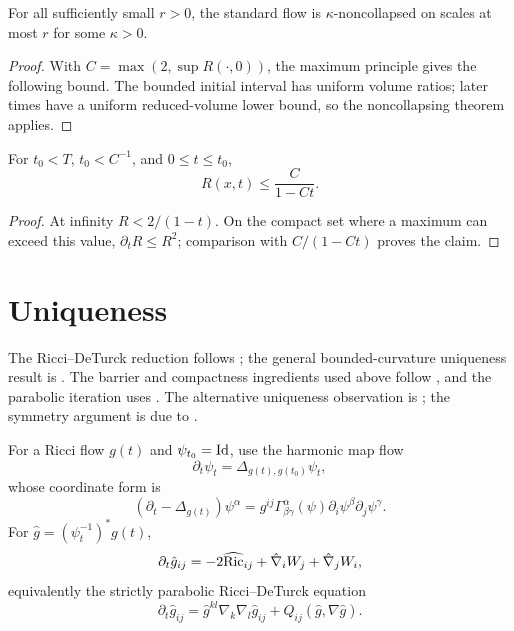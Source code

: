 \begin{proposition}
\label{prop:standard-flow-kappa-noncollapsed}
\label{stdkappa}

For all sufficiently small $r>0$, the standard flow is
$\kappa$-noncollapsed on scales at most $r$ for some $\kappa>0$.
\end{proposition}
\begin{proof}

\sketch With $C=\max(2,\sup R(\cdot,0))$, the maximum principle gives
the following bound. The bounded initial interval has uniform volume ratios;
later times have a uniform reduced-volume lower bound, so the noncollapsing
theorem applies.
\end{proof}
\begin{claim}
\label{claim:standard-flow-curvature-bound}

For $t_0<T$, $t_0<C^{-1}$, and $0\le t\le t_0$,
\[R(x,t)\le\frac C{1-Ct}.\]
\end{claim}
\begin{proof}
\sketch At infinity $R<2/(1-t)$. On the compact set where a maximum can
exceed this value, $\partial_tR\le R^2$; comparison with $C/(1-Ct)$ proves
the claim.
\end{proof}

\section{Uniqueness}\label{12.4}
The Ricci--DeTurck reduction follows \cite{DeTurck}\cite{LuTian}; the general
bounded-curvature uniqueness result is \cite{ChenZhu}. The barrier and
compactness ingredients used above follow \cite{Hamiltonlimits}\cite{Shi1},
and the parabolic iteration uses \cite{LiTam}\cite{LiTam}\cite{LSU}\cite{LSU}.
The alternative uniqueness observation is \cite{ChenZhu}; the symmetry
argument is due to \cite{ChowKnopf}.

For a Ricci flow $g(t)$ and $\psi_{t_0}=\operatorname{Id}$, use the harmonic map flow
\begin{equation}\label{eq2.1}\partial_t\psi_t=\Delta_{g(t),g(t_0)}\psi_t,\end{equation}
whose coordinate form is
\begin{equation}\label{eq2.2}
(\partial_t-\Delta_{g(t)})\psi^\alpha=g^{ij}\Gamma^\alpha_{\beta\gamma}(\psi)\partial_i\psi^\beta\partial_j\psi^\gamma.
\end{equation}
For $\hat g=(\psi_t^{-1})^*g(t)$,
\begin{equation}\label{RDfloweqn}
\partial_t\hat g_{ij}=-2\widehat{\operatorname{Ric}}_{ij}+\hat\nabla_iW_j+\hat\nabla_jW_i,
\end{equation}
equivalently the strictly parabolic Ricci--DeTurck equation
\begin{equation}\label{eqRcDeTurck}
\partial_t\hat g_{ij}=\hat g^{kl}\nabla_k\nabla_l\hat g_{ij}+Q_{ij}(\hat g,\nabla\hat g).
\end{equation}

